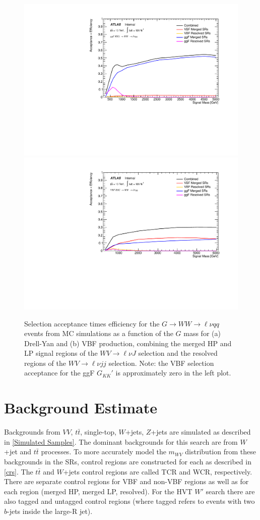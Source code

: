 \begin{figure}[h!]
  \centering
\includegraphics[width=0.48\hsize]{figures/Analysis/signal_acceptance/Acc_times_Eff1lepggFRSG.pdf}
    \includegraphics[width=0.48\hsize]{figures/Analysis/signal_acceptance/Acc_times_Eff1lepVBFRSG.pdf}

      \caption{Selection acceptance times efficiency for the $G\to WW\to \ell \nu qq$ events from MC simulations as a function of the $G$ mass for (a) Drell-Yan and (b) VBF production, combining the merged HP and LP signal regions of the $WV\to \ell\nu J$ selection and the resolved regions of the $WV\to \ell\nu jj$ selection. Note: the VBF selection acceptance for the ggF $G_{KK}'$ is approximately zero in the left plot.} 
  \label{fig:accept_rsg}
\end{figure} 
\FloatBarrier
\chapter{Background Estimate}
Backgrounds from $VV$, $t\bar{t}$, single-top, $W$+jets, $Z$+jets are simulated as described in \ref{Simulated Samples}. The dominant backgrounds for this search are from $W$+jet and $t\bar{t}$ processes. To more accurately model the $m_{WV}$ distribution from these backgrounds in the SRs, control regions are constructed for each as described in \ref{crs}. The $t\bar{t}$ and $W$+jets control regions are called TCR and WCR, respectively. There are separate control regions for VBF and non-VBF regions as well as for each region (merged HP, merged LP, resolved). For the HVT $W'$ search there are also tagged and untagged control regions (where tagged refers to events with two $b$-jets inside the large-R jet). 

